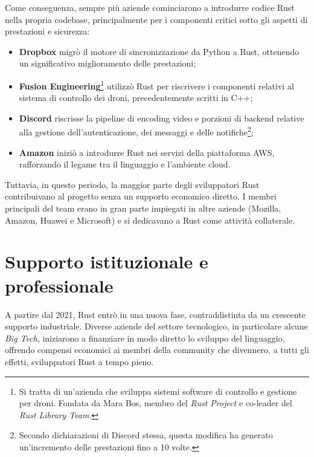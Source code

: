 Come conseguenza, sempre più aziende cominciarono a introdurre codice Rust nella propria codebase, principalmente per i componenti critici sotto 
gli aspetti di prestazioni e sicurezza:
\begin{itemize}
    \item \textbf{Dropbox} migrò il motore di sincronizzazione da Python a Rust, ottenendo un significativo miglioramento delle prestazioni;
    \item \textbf{Fusion Engineering}\footnote{Si tratta di un'azienda che sviluppa sistemi software di controllo e gestione per droni. Fondata da Mara Bos, membro del \textit{Rust Project} e co-leader del \textit{Rust Library Team}.} utilizzò Rust per riscrivere i componenti relativi al sistema di controllo dei droni, precedentemente scritti in C++;
    \item \textbf{Discord} riscrisse la pipeline di encoding video e porzioni di backend relative alla gestione dell'autenticazione, dei messaggi e delle notifiche\footnote{Secondo dichiarazioni di Discord stessa, questa modifica ha generato un'incremento delle prestazioni fino a 10 volte.};
    \item \textbf{Amazon} iniziò a introdurre Rust nei servizi della piattaforma AWS, rafforzando il legame tra il linguaggio e l'ambiente cloud.
\end{itemize}
Tuttavia, in questo periodo, la maggior parte degli sviluppatori Rust contribuivano al progetto senza un supporto economico diretto.
I membri principali del team erano in gran parte impiegati in altre aziende (Mozilla, Amazon, Huawei e Microsoft) e si dedicavano a Rust come attività collaterale.

\section{Supporto istituzionale e professionale}
A partire dal 2021, Rust entrò in una nuova fase, contraddistinta da un crescente supporto industriale. Diverse aziende del settore 
tecnologico, in particolare alcune \textit{Big Tech}, iniziarono a finanziare in modo diretto lo sviluppo del linguaggio, offrendo compensi 
economici ai membri della community che divennero, a tutti gli effetti, sviluppatori Rust a tempo pieno.


